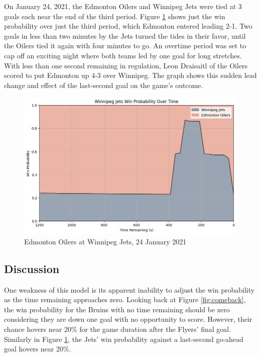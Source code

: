 \documentclass{article}
\begin{document}
On January 24, 2021, the Edmonton Oilers and Winnipeg Jets were tied at 3 goals each near the end of the third period.
Figure \ref{fig:goahead} shows just the win probability over just the third period, which Edmonton entered leading 2-1.
Two goals in less than two minutes by the Jets turned the tides in their favor, until the Oilers tied it again with four minutes to go.
An overtime period was set to cap off an exciting night where both teams led by one goal for long stretches.
With less than one second remaining in regulation, Leon Draisaitl of the Oilers scored to put Edmonton up 4-3 over Winnipeg.
The graph shows this sudden lead change and effect of the last-second goal on the game's outcome.

\begin{figure}
    \centering
    \includegraphics[width=1\linewidth]{2020020086.png}
    \caption{Edmonton Oilers at Winnipeg Jets, 24 January 2021}
    \label{fig:goahead}
\end{figure}

\subsection{Discussion}
One weakness of this model is its apparent inability to adjust the win probability as the time remaining approaches zero.
Looking back at Figure \ref{fig:comeback}, the win probability for the Bruins with no time remaining should be zero considering they are down one goal with no opportunity to score.
However, their chance hovers near 20\% for the game duration after the Flyers' final goal.
Similarly in Figure \ref{fig:goahead}, the Jets' win probability against a last-second go-ahead goal hovers near 20\%.
\end{document}

